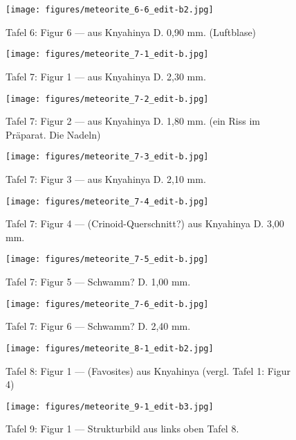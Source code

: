 \documentclass[a4paper, 12pt, oneside]{article}
\begin{document}
\clearpage
\begin{figure}[t]
\texttt{[image: figures/meteorite\_6-6\_edit-b2.jpg]}
\caption{Tafel 6: Figur 6 --- aus Knyahinya D. 0,90 mm. (Luftblase)}
\centering
\end{figure}
\clearpage
{}
\begin{figure}[t]
\texttt{[image: figures/meteorite\_7-1\_edit-b.jpg]}
\caption{Tafel 7: Figur 1 --- aus Knyahinya D. 2,30 mm.}
\centering
\end{figure}
\clearpage
\begin{figure}[t]
\texttt{[image: figures/meteorite\_7-2\_edit-b.jpg]}
\caption{Tafel 7: Figur 2 --- aus Knyahinya D. 1,80 mm. (ein Riss im Präparat. Die Nadeln)}
\centering
\end{figure}
\clearpage
\begin{figure}[t]
\texttt{[image: figures/meteorite\_7-3\_edit-b.jpg]}
\caption{Tafel 7: Figur 3 --- aus Knyahinya D. 2,10 mm.}
\centering
\end{figure}
\clearpage
\begin{figure}[t]
\texttt{[image: figures/meteorite\_7-4\_edit-b.jpg]}
\caption{Tafel 7: Figur 4 --- (Crinoid-Querschnitt?) aus Knyahinya D. 3,00 mm.}
\centering
\end{figure}
\clearpage
\begin{figure}[t]
\texttt{[image: figures/meteorite\_7-5\_edit-b.jpg]}
\caption{Tafel 7: Figur 5 --- Schwamm? D. 1,00 mm.}
\centering
\end{figure}
\clearpage
\begin{figure}[t]
\texttt{[image: figures/meteorite\_7-6\_edit-b.jpg]}
\caption{Tafel 7: Figur 6 --- Schwamm? D. 2,40 mm.}
\centering
\end{figure}
\clearpage
{}
\begin{figure}[t]
\texttt{[image: figures/meteorite\_8-1\_edit-b2.jpg]}
\caption{Tafel 8: Figur 1 --- (Favosites) aus Knyahinya (vergl. Tafel 1: Figur 4)}
\centering
\end{figure}
\clearpage
{}
\begin{figure}[t]
\texttt{[image: figures/meteorite\_9-1\_edit-b3.jpg]}
\caption{Tafel 9: Figur 1 --- Strukturbild aus links oben Tafel 8.}
\centering
\end{figure}
\end{document}
